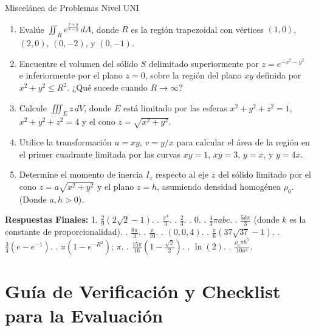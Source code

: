 \documentclass[11pt,a4paper]{article}
\begin{document}
\begin{ejerciciobox}{Miscelánea de Problemas Nivel UNI}
\begin{enumerate}
    \item Evalúe $\iint_R e^{\frac{x+y}{x-y}} \, dA$, donde $R$ es la región trapezoidal con vértices $(1,0)$, $(2,0)$, $(0,-2)$, y $(0,-1)$.
    
    \item Encuentre el volumen del sólido $S$ delimitado superiormente por $z = e^{-x^2-y^2}$ e inferiormente por el plano $z=0$, sobre la región del plano $xy$ definida por $x^2+y^2 \leq R^2$. ¿Qué sucede cuando $R \to \infty$?
    
    \item Calcule $\iiint_E z \, dV$, donde $E$ está limitado por las esferas $x^2+y^2+z^2 = 1$, $x^2+y^2+z^2 = 4$ y el cono $z = \sqrt{x^2+y^2}$.
    
    \item Utilice la transformación $u = xy$, $v = y/x$ para calcular el área de la región en el primer cuadrante limitada por las curvas $xy = 1$, $xy = 3$, $y = x$, y $y = 4x$.
    
    \item Determine el momento de inercia $I_z$ respecto al eje $z$ del sólido limitado por el cono $z = a\sqrt{x^2+y^2}$ y el plano $z=h$, asumiendo densidad homogénea $\rho_0$. (Donde $a, h > 0$).
\end{enumerate}

\textbf{Respuestas Finales:}
1. $\frac{2}{9}(2\sqrt{2}-1)$. . $\frac{\pi^4}{3}$. . $\frac{2}{3}$. . $0$. . $\frac{4}{3}\pi abc$. . $\frac{5k\pi}{3}$ (donde $k$ es la constante de proporcionalidad). . $\frac{8\pi}{3}$. . $\frac{\pi}{10}$. . $(0,0,4)$. . $\frac{\pi}{6}(37\sqrt{37}-1)$. . $\frac{3}{4}(e-e^{-1})$. . $\pi(1-e^{-R^2})$; $\pi$. . $\frac{15\pi}{16}\left(1-\frac{\sqrt{2}}{2}\right)$. . $\ln(2)$. . $\frac{\rho_0 \pi h^5}{10 a^4}$.
\end{ejerciciobox}

\section{Guía de Verificación y Checklist para la Evaluación}
\end{document}

